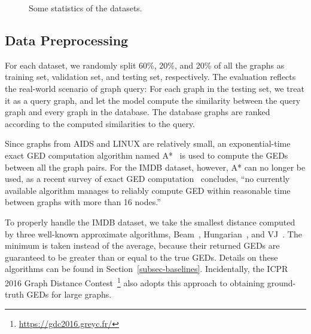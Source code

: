 \documentclass[sigconf]{acmart}
\begin{document}
\begin{figure*}
    \centering
    \vspace{-0.1in}
    \caption{Some statistics of the datasets.}
    \vspace{-0.1in}
    \label{fig:dataset_vis}
\end{figure*}

\subsection{Data Preprocessing}
\label{subsec-data-preproc}

For each dataset, we randomly split 60\%, 20\%, and 20\% of all the graphs as training set, validation set, and testing set, respectively. The evaluation reflects the real-world scenario of graph query: For each graph in the testing set, we treat it as a query graph, and let the model compute the similarity between the query graph and every graph in the database. The database graphs are ranked according to the computed similarities to the query.

Since graphs from AIDS and LINUX are relatively small, an exponential-time exact GED computation algorithm named A*~\cite{riesen2013novel} is used to compute the GEDs between all the graph pairs. For the IMDB dataset, however, A* can no longer be used, as a recent survey of exact GED computation~\cite{blumenthal2018exact} concludes, ``no currently available algorithm manages to reliably compute GED within reasonable time between graphs with more than 16 nodes.'' 

To properly handle the IMDB dataset, we take the smallest distance computed by three well-known approximate algorithms, 	Beam~\cite{neuhaus2006fast}, Hungarian~\cite{kuhn1955hungarian,riesen2009approximate}, and VJ~\cite{jonker1987shortest,fankhauser2011speeding}. The minimum is taken instead of the average, because their returned GEDs are guaranteed to be greater than or equal to the true GEDs. Details on these algorithms can be found in Section~\ref{subsec-baselines}. Incidentally, the ICPR 2016 Graph Distance Contest~\footnote{\url{https://gdc2016.greyc.fr/}} also adopts this approach to obtaining ground-truth GEDs for large graphs.
\end{document}
